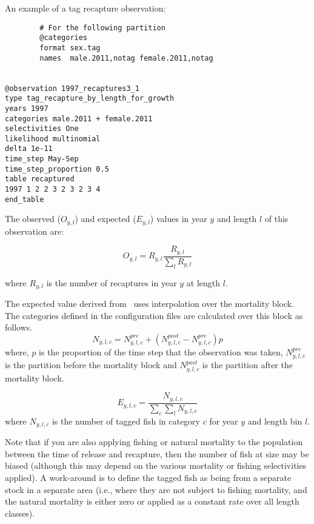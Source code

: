 An example of a tag recapture observation:

{\small{\begin{verbatim}
		# For the following partition
		@categories
		format sex.tag
		names  male.2011,notag female.2011,notag
		

@observation 1997_recaptures3_1
type tag_recapture_by_length_for_growth
years 1997
categories male.2011 + female.2011
selectivities One
likelihood multinomial
delta 1e-11
time_step May-Sep
time_step_proportion 0.5
table recaptured
1997 1 2 2 3 2 3 2 3 4
end_table
\end{verbatim}}}

The observed ($O_{y,l}$) and expected ($E_{y,l}$) values in year $y$ and length $l$ of this observation are:

\begin{equation}
O_{y,l} = R_{y,l} \frac{R_{y,l}}{\sum_l R_{y,l}}
\end{equation}

where $R_{y,l}$ is the number of recaptures in year $y$ at length $l$.

The expected value derived from \CNAME\ uses interpolation over the mortality block. The categories defined in the configuration files are calculated over this block as follows.
\begin{equation}
N_{y,l,c} = N^{pre}_{y,l,c} +   (N^{post}_{y,l,c} - N^{pre}_{y,l,c})p
\end{equation}
where, $p$ is the proportion of the time step that the observation was taken, \(N^{pre}_{y,l,c}\) is the partition before the mortality block and \(N^{post}_{y,l,c}\) is the partition after the mortality block.

\begin{equation}
E_{y,l,c} = \frac{N_{y,l,c}}{\sum_c\sum_l N_{y,l,c}}
\end{equation}
where $N_{y,l,c}$ is the number of tagged fish in category \(c\) for year \(y\) and length bin \(l\).

Note that if you are also applying fishing or natural mortality to the population between the time of release and recapture, then the number of fish at size may be biased (although this may depend on the various mortality or fishing selectivities applied). A work-around is to define the tagged fish as being from a separate stock in a separate area (i.e., where they are not subject to fishing mortality, and the natural mortality is either zero or applied as a constant rate over all length classes).
\fi %


